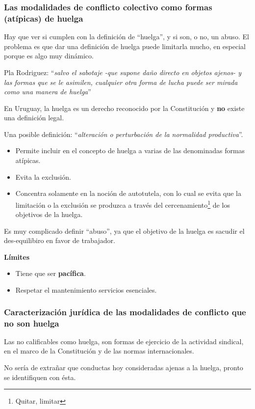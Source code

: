 \documentclass[spanish,12pt,a4paper,titlepage]{report}
\begin{document}
\subsubsection{Las modalidades de conflicto colectivo como formas (atípicas) de huelga}

Hay que ver si cumplen con la definición de ``huelga'', y si son, o no, un abuso. El problema es que dar una definición de huelga puede limitarla mucho, en especial porque es algo muy dinámico.

Pla Rodriguez: ``\textit{salvo el sabotaje -que supone daño directo en objetos ajenos- y las formas que se le asimilen, cualquier otra forma de lucha puede ser mirada como una manera de huelga}''

En Uruguay, la huelga es un derecho reconocido por la Constitución y \textbf{no} existe una definición legal.

Una posible definición: ``\textit{alteración o perturbación de la normalidad productiva}''.
\begin{itemize}
\item Permite incluir en el concepto de huelga a varias de las denominadas formas atípicas.
\item Evita la exclusión.
\item Concentra solamente en la noción de autotutela, con lo cual se evita que la limitación o la exclusión se produzca a través del cercenamiento\footnote{Quitar, limitar} de los objetivos de la huelga.
\end{itemize}

Es muy complicado definir ``abuso'', ya que el objetivo de la huelga es sacudir el des-equilibiro en favor de trabajador. 

\textbf{Límites}
\begin{itemize}
\item Tiene que ser \textbf{pacífica}.
\item Respetar el mantenimiento servicios esenciales.
\end{itemize}
\subsubsection{Caracterización jurídica de las modalidades de conflicto que no son huelga}

Las no calificables como huelga, son formas de ejercicio de la actividad sindical, en el marco de la Constitución y de las normas internacionales. 

No sería de extrañar que conductas hoy consideradas ajenas a la huelga, pronto se identifiquen con ésta.
\end{document}
